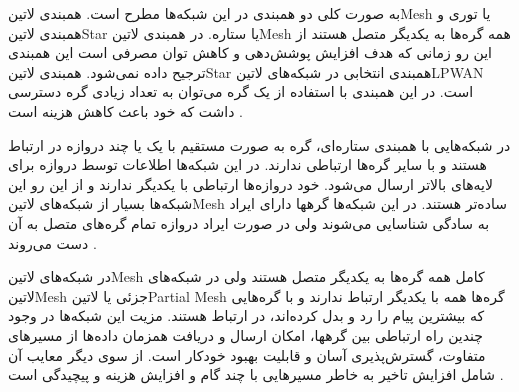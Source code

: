 
به صورت کلی دو همبندی در این شبکه‌ها مطرح است. همبندی ‌لاتین{Mesh} یا توری
و همبندی ‌لاتین{Star} یا ستاره.
در همبندی ‌لاتین{Mesh} همه گره‌ها به یکدیگر متصل هستند از این رو زمانی که هدف
افزایش پوشش‌دهی و کاهش توان مصرفی است این همبندی ترجیح داده نمی‌شود. همبندی
‌لاتین{Star} همبندی انتخابی در شبکه‌های ‌لاتین{LPWAN} است.
در این همبندی با استفاده از یک گره می‌توان به تعداد زیادی گره دسترسی داشت که
خود باعث کاهش هزینه است
.

در شبکه‌هایی با همبندی ستاره‌ای، گره به صورت مستقیم با یک یا چند دروازه در ارتباط هستند
و با سایر گره‌ها ارتباطی ندارند. در این شبکه‌ها اطلاعات توسط دروازه برای لایه‌های بالاتر ارسال می‌شود.
خود دروازه‌ها ارتباطی با یکدیگر ندارند و از این رو این شبکه‌ها بسیار از شبکه‌های ‌لاتین{Mesh} ساده‌تر هستند.
در این شبکه‌ها گرهها دارای ایراد به سادگی شناسایی می‌شوند ولی در صورت ایراد دروازه تمام گره‌های
متصل به آن دست می‌روند
.

در شبکه‌های ‌لاتین{Mesh} کامل همه گره‌ها به یکدیگر متصل هستند ولی در شبکه‌های ‌لاتین{Mesh} جزئی یا ‌لاتین{Partial Mesh} گره‌ها
همه با یکدیگر ارتباط ندارند و با گره‌هایی که بیشترین پیام را رد و بدل کرده‌اند، در ارتباط هستند.
مزیت این شبکه‌ها در وجود چندین راه ارتباطی بین گرهها، امکان ارسال و دریافت همزمان داده‌ها از مسیرهای متفاوت،
گسترش‌پذیری آسان و قابلیت بهبود خودکار است. از سوی دیگر معایب آن شامل افزایش تاخیر به خاطر مسیرهایی با چند گام و
افزایش هزینه و پیچیدگی است
.
